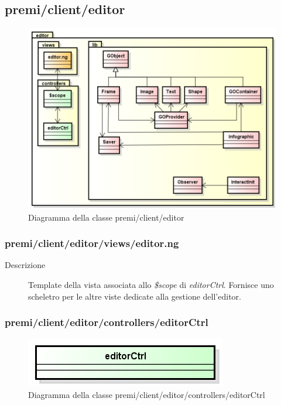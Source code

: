 \clearpage
\subsection{premi/client/editor}
\begin{figure}[H]
\begin{center}
\includegraphics[scale=0.70]{img/diapkg/editor.png}
\caption{Diagramma della classe premi/client/editor}
\end{center}
\end{figure}

\subsubsection{premi/client/editor/views/editor.ng}

\begin{description}
\item[Descrizione] \hfill
	Template della vista associata allo \textit{\$scope} di \textit{editorCtrl}. Fornisce uno scheletro per le altre viste dedicate alla gestione dell'editor. 
\end{description}


\subsubsection{premi/client/editor/controllers/editorCtrl}
\begin{figure}[H]
\begin{center}
\includegraphics[scale=0.80]{img/diacla/editorCtrl.png}
\caption{Diagramma della classe premi/client/editor/controllers/editorCtrl}
\end{center}
\end{figure}

